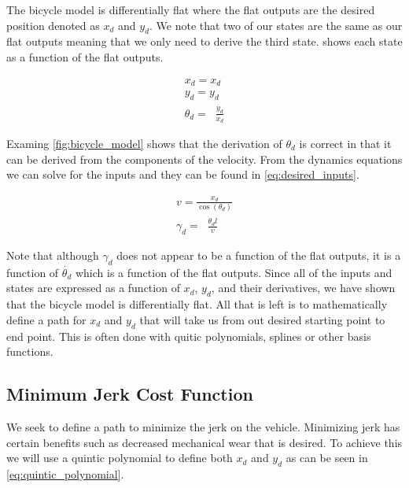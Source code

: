 \documentclass{article}
\DeclareMathOperator{\taninv}{\tan^{-1}}
\begin{document}
The bicycle model is differentially flat where the flat outputs are the desired position denoted as 
$x_d$ and $y_d$. We note that two of our states are the same as our flat outputs meaning that we only
need to derive the third state.  shows each state as a function of the flat outputs.

\begin{equation}
  \begin{aligned}
    x_d = x_d \\
    y_d = y_d \\
    \theta_d = \taninv{\frac{\dot{y_d}}{\dot{x_d}}}
  \end{aligned}
  \label{eq:desired_states}
\end{equation}

Examing \cref{fig:bicycle_model} shows that the derivation of $\theta_d$ is correct in that
it can be derived from the components of the velocity. From the dynamics equations we can solve for the inputs and they can 
be found in \cref{eq:desired_inputs}.

\begin{equation}
  \begin{aligned}
    v = \frac{x_d}{\cos(\theta_d)} \\
    \gamma_d = \taninv{\frac{\dot{\theta}_d l}{v}}
  \end{aligned}
  \label{eq:desired_inputs}
\end{equation}

Note that although $\gamma_d$ does not appear to be a function of the flat outputs, it is a function
of $\dot{\theta_d}$ which is a function of the flat outputs. Since all of the inputs and states are expressed as a function of $x_d$, $y_d$, and 
their derivatives, we have shown that the bicycle model is differentially flat. All that is 
left is to mathematically define a path for $x_d$ and $y_d$ that will take us from out desired 
starting point to end point. This is often done with quitic polynomials, splines or other basis functions.

\subsection{Minimum Jerk Cost Function}

We seek to define a path to minimize the jerk on the vehicle. Minimizing jerk has 
certain benefits such as decreased mechanical wear that is desired. To achieve this
we will use a quintic polynomial to define both $x_d$ and $y_d$ as can be seen in \cref{eq:quintic_polynomial}.
\end{document}

